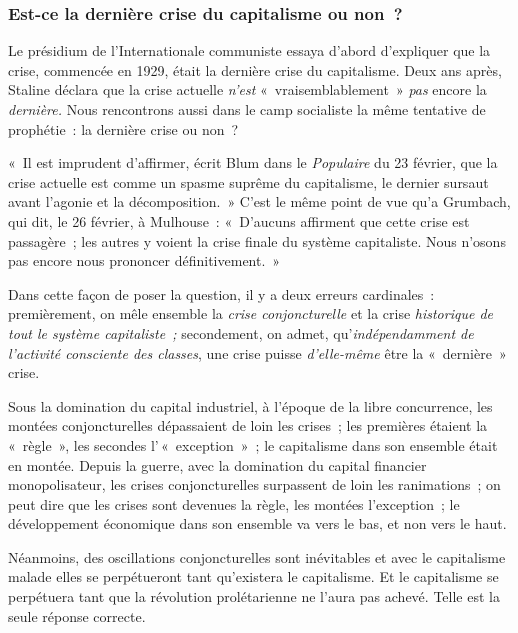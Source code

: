\documentclass[french,twoside]{book} %
\begin{document}
\subsubsection[{Est-ce la dernière crise du capitalisme ou non ?}]{Est-ce la dernière crise du capitalisme ou non ?}
\noindent Le présidium de l’Internationale communiste essaya d’abord d’expliquer que la crise, commencée en 1929, était la dernière crise du capitalisme. Deux ans après, Staline  déclara que la crise actuelle \emph{n’est} « vraisemblablement » \emph{pas} encore la \emph{dernière.} Nous rencontrons aussi dans le camp socialiste la même tentative de prophétie : la dernière crise ou non ?\par
« Il est imprudent d’affirmer, écrit Blum dans le \emph{Populaire} du 23 février, que la crise actuelle est comme un spasme suprême du capitalisme, le dernier sursaut avant l’agonie et la décomposition. » C’est le même point de vue qu’a Grumbach, qui dit, le 26 février, à Mulhouse : « D’aucuns affirment que cette crise est passagère ; les autres y voient la crise finale du système capitaliste. Nous n’osons pas encore nous prononcer définitivement. »\par
Dans cette façon de poser la question, il y a deux erreurs cardinales : premièrement, on mêle ensemble la \emph{crise conjoncturelle} et la crise \emph{historique de tout le système capitaliste ;} secondement, on admet, qu’\emph{indépendamment de l’activité consciente des classes}, une crise puisse \emph{d’elle-même} être la « dernière » crise.\par
Sous la domination du capital industriel, à l’époque de la libre concurrence, les montées conjoncturelles dépassaient de loin les crises ; les premières étaient la « règle », les secondes l’ « exception » ; le capitalisme dans son ensemble était en montée. Depuis la guerre, avec la domination du capital financier monopolisateur, les crises conjoncturelles surpassent de loin les ranimations ; on peut dire que les crises sont devenues la règle, les montées l’exception ; le développement économique dans son ensemble va vers le bas, et non vers le haut.\par
Néanmoins, des oscillations conjoncturelles sont inévitables et avec le capitalisme malade elles se perpétueront tant qu’existera le capitalisme. Et le capitalisme se perpétuera tant que la révolution prolétarienne ne l’aura pas achevé. Telle est la seule réponse correcte.
\end{document}
